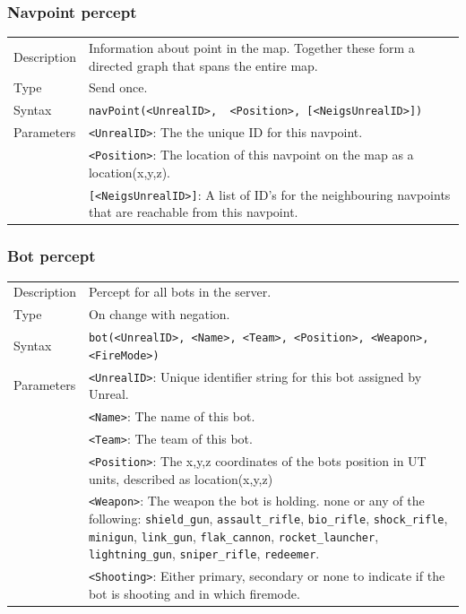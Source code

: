 \documentclass[11pt,a4paper]{article}
\begin{document}
\subsubsection*{Navpoint percept}
\begin{small}
\begin{tabular}{p{2cm}p{9cm}}
Description & Information about point in the map. Together these form a directed graph that spans the entire map.\\
Type & Send once.\\
Syntax & \verb|navPoint(<UnrealID>,  <Position>, [<NeigsUnrealID>])|\\
Parameters & \verb|<UnrealID>|: The the unique ID for this navpoint.\\
& \verb|<Position>|: The location of this navpoint on the map as a location(x,y,z).\\
& \verb|[<NeigsUnrealID>]|: A list of ID's for the neighbouring navpoints that are reachable from this navpoint.
\end{tabular}
\end{small}

\subsubsection*{Bot percept}
\begin{small}
\begin{tabular}{p{2cm}p{9cm}}
Description & Percept for all bots in the server.\\
Type & On change with negation.\\
Syntax & \verb|bot(<UnrealID>, <Name>, <Team>, <Position>, <Weapon>, <FireMode>)|\\
Parameters &
	\verb|<UnrealID>|: Unique identifier string for this bot assigned by Unreal.\\
&	\verb|<Name>|: The name of this bot.\\
&	\verb|<Team>|: The team of this bot.\\
&	\verb|<Position>|: The x,y,z coordinates of the bots position in UT units, described as location(x,y,z)\\
&	\verb|<Weapon>|: The weapon the bot is holding. none or any of the following: \verb|shield_gun|, \verb|assault_rifle|, \verb|bio_rifle|, \verb|shock_rifle|, \verb|minigun|, \verb|link_gun|, \verb|flak_cannon|, \verb|rocket_launcher|, \verb|lightning_gun|, \verb|sniper_rifle|, \verb|redeemer|.\\
&	\verb|<Shooting>|: Either primary, secondary or none to indicate if the bot is shooting and in which firemode.
\end{tabular}
\end{small}
\end{document}
